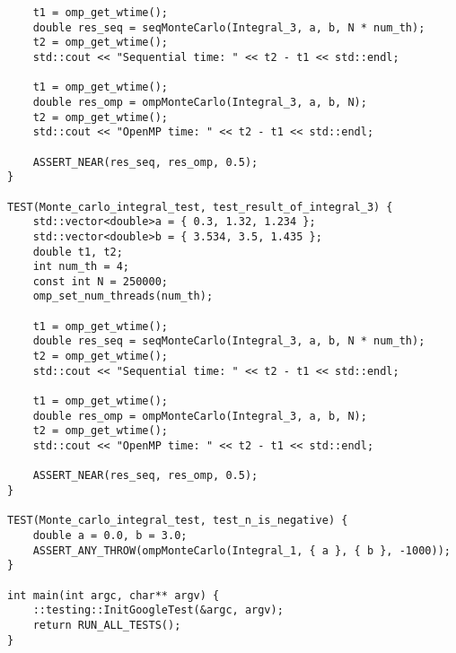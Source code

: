\documentclass{report}
\begin{document}
\begin{lstlisting}
    t1 = omp_get_wtime();
    double res_seq = seqMonteCarlo(Integral_3, a, b, N * num_th);
    t2 = omp_get_wtime();
    std::cout << "Sequential time: " << t2 - t1 << std::endl;

    t1 = omp_get_wtime();
    double res_omp = ompMonteCarlo(Integral_3, a, b, N);
    t2 = omp_get_wtime();
    std::cout << "OpenMP time: " << t2 - t1 << std::endl;

    ASSERT_NEAR(res_seq, res_omp, 0.5);
}

TEST(Monte_carlo_integral_test, test_result_of_integral_3) {
    std::vector<double>a = { 0.3, 1.32, 1.234 };
    std::vector<double>b = { 3.534, 3.5, 1.435 };
    double t1, t2;
    int num_th = 4;
    const int N = 250000;
    omp_set_num_threads(num_th);

    t1 = omp_get_wtime();
    double res_seq = seqMonteCarlo(Integral_3, a, b, N * num_th);
    t2 = omp_get_wtime();
    std::cout << "Sequential time: " << t2 - t1 << std::endl;

    t1 = omp_get_wtime();
    double res_omp = ompMonteCarlo(Integral_3, a, b, N);
    t2 = omp_get_wtime();
    std::cout << "OpenMP time: " << t2 - t1 << std::endl;

    ASSERT_NEAR(res_seq, res_omp, 0.5);
}

TEST(Monte_carlo_integral_test, test_n_is_negative) {
    double a = 0.0, b = 3.0;
    ASSERT_ANY_THROW(ompMonteCarlo(Integral_1, { a }, { b }, -1000));
}

int main(int argc, char** argv) {
    ::testing::InitGoogleTest(&argc, argv);
    return RUN_ALL_TESTS();
}
\end{lstlisting}
\end{document}
